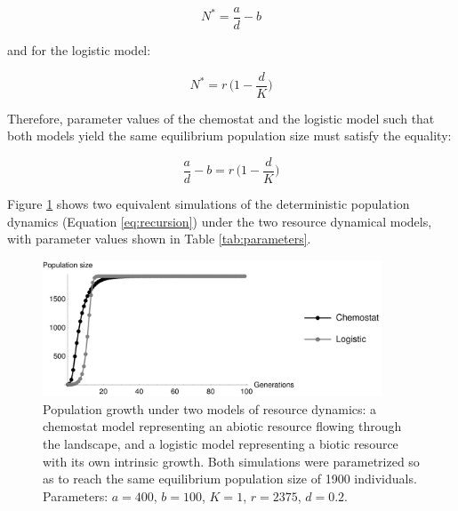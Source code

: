 \begin{equation}
    N^* = \frac{a}{d}-b
\end{equation}

and for the logistic model:

\begin{equation}
    N^* = r\,\bigg(1-\frac{d}{K}\bigg)
\end{equation}

Therefore, parameter values of the chemostat and the logistic model such that both models yield the same equilibrium population size must satisfy the equality:

\begin{equation}
    \frac{a}{d}-b = r\,\bigg(1-\frac{d}{K}\bigg)
\end{equation}

Figure \ref{fig:chemostat_vs_logistic} shows two equivalent simulations of the deterministic population dynamics (Equation \ref{eq:recursion}) under the two resource dynamical models, with parameter values shown in Table \ref{tab:parameters}.

\begin{figure}
    \centering
    \includegraphics[width=0.9\textwidth]{figures/chemostat_vs_logistic.png}
    \caption{Population growth under two models of resource dynamics: a chemostat model representing an abiotic resource flowing through the landscape, and a logistic model representing a biotic resource with its own intrinsic growth. Both simulations were parametrized so as to reach the same equilibrium population size of 1900 individuals. Parameters: $a = 400$, $b = 100$, $K = 1$, $r = 2375$, $d = 0.2$.}
    \label{fig:chemostat_vs_logistic}
\end{figure}
